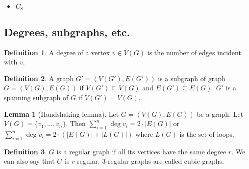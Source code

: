 \documentclass{article}
\theoremstyle{definition}
\newtheorem{lemma}[theorem]{Lemma}
\newtheorem{dd}{Definition}[section]
\begin{document}
\begin{itemize}
{        \begin{itemize}
            \item {
                $C_8$ \par
            }
        \end{itemize}
    }
\end{itemize}

\subsection{Degrees, subgraphs, etc.}

\begin{dd}
    A degree of a vertex $v \in V(G)$ is the number of edges incident with $v$.
\end{dd}

\begin{dd}
    A graph $G' = \left( V(G'), E(G') \right)$ is a subgraph of graph $G = \left( V(G), E(G) \right)$ if $V(G') \subseteq V(G)$ and $E(G') \subseteq E(G)$. $G'$ is a spanning subgraph of $G$ if $V(G') = V(G)$.
\end{dd}

\begin{lemma}[Handshaking lemma]
    Let $G = \left( V(G), E(G) \right)$ be a graph. Let $V(G) = \{ v_1, \dots, v_n \}$. Then $\sum\limits_{i = 1}^n \deg v_i = 2 \cdot |E(G)|$ or $\sum\limits_{i = 1}^n \deg v_i = 2 \cdot (|E(G)| + |L(G)|)$ where $L(G)$ is the set of loops.
\end{lemma}

\begin{dd}
    $G$ is a regular graph if all its vertices have the same degree $r$. We can also say that $G$ is $r$-regular. 3-regular graphs are called cubic graphs. 
\end{dd}
\end{document}
